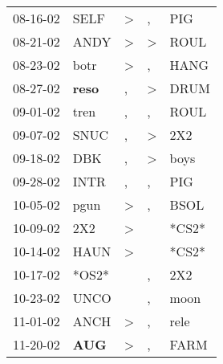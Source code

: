 \begin{supertabular}{p{0.07\textwidth}p{0.06\textwidth}p{0.02\textwidth}p{0.02\textwidth}p{0.06\textwidth}}
          08-16-02\textsuperscript{} &           SELF\textsuperscript{} &     \textgreater &             , &            PIG\textsuperscript{} \\
          08-21-02\textsuperscript{} &           ANDY\textsuperscript{} &     \textgreater &  \textgreater &           ROUL\textsuperscript{} \\
          08-23-02\textsuperscript{} &           botr\textsuperscript{} &     \textgreater &             , &           HANG\textsuperscript{} \\
          08-27-02\textsuperscript{} &  \textbf{reso\textsuperscript{}} &                , &  \textgreater &           DRUM\textsuperscript{} \\
          09-01-02\textsuperscript{} &           tren\textsuperscript{} &                , &             , &           ROUL\textsuperscript{} \\
          09-07-02\textsuperscript{} &           SNUC\textsuperscript{} &                , &  \textgreater &            2X2\textsuperscript{} \\
          09-18-02\textsuperscript{} &            DBK\textsuperscript{} &                , &  \textgreater &           boys\textsuperscript{} \\
          09-28-02\textsuperscript{} &           INTR\textsuperscript{} &                , &             , &            PIG\textsuperscript{} \\
          10-05-02\textsuperscript{} &           pgun\textsuperscript{} &     \textgreater &             , &           BSOL\textsuperscript{} \\
          10-09-02\textsuperscript{} &            2X2\textsuperscript{} &     \textgreater &               &                            *CS2* \\
          10-14-02\textsuperscript{} &           HAUN\textsuperscript{} &     \textgreater &               &                            *CS2* \\
          10-17-02\textsuperscript{} &                            *OS2* &                  &             , &            2X2\textsuperscript{} \\
          10-23-02\textsuperscript{} &           UNCO\textsuperscript{} &                  &             , &           moon\textsuperscript{} \\
          11-01-02\textsuperscript{} &           ANCH\textsuperscript{} &     \textgreater &             , &           rele\textsuperscript{} \\
          11-20-02\textsuperscript{} &   \textbf{AUG\textsuperscript{}} &     \textgreater &             , &           FARM\textsuperscript{} \\

\end{supertabular}
